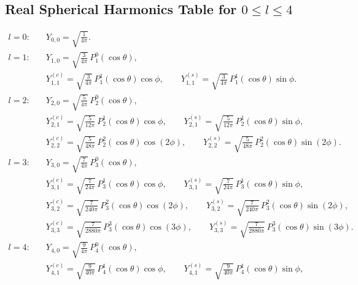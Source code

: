 \clearpage
\subsection*{Real Spherical Harmonics Table for $0\le l\le4$}
\begin{align*}
      l=0:\quad &Y_{0,0}=\sqrt{\frac{1}{4\pi}}.\\
      l=1:\quad &Y_{1,0}=\sqrt{\frac{3}{4\pi}}\,P_1^0(\cos\theta),\\
                                    &Y_{1,1}^{(c)}=\sqrt{\frac{3}{4\pi}}\,P_1^1(\cos\theta)\cos\phi,\qquad
                                     Y_{1,1}^{(s)}=\sqrt{\frac{3}{4\pi}}\,P_1^1(\cos\theta)\sin\phi.\\
      l=2:\quad &Y_{2,0}=\sqrt{\frac{5}{4\pi}}\,P_2^0(\cos\theta),\\
                                    &Y_{2,1}^{(c)}=\sqrt{\frac{5}{12\pi}}\,P_2^1(\cos\theta)\cos\phi,\qquad
                                     Y_{2,1}^{(s)}=\sqrt{\frac{5}{12\pi}}\,P_2^1(\cos\theta)\sin\phi,\\
                                    &Y_{2,2}^{(c)}=\sqrt{\frac{5}{48\pi}}\,P_2^2(\cos\theta)\cos(2\phi),\qquad
                                     Y_{2,2}^{(s)}=\sqrt{\frac{5}{48\pi}}\,P_2^2(\cos\theta)\sin(2\phi).\\
      l=3:\quad &Y_{3,0}=\sqrt{\frac{7}{4\pi}}\,P_3^0(\cos\theta),\\
                                    &Y_{3,1}^{(c)}=\sqrt{\frac{7}{24\pi}}\,P_3^1(\cos\theta)\cos\phi,\qquad
                                     Y_{3,1}^{(s)}=\sqrt{\frac{7}{24\pi}}\,P_3^1(\cos\theta)\sin\phi,\\
                                    &Y_{3,2}^{(c)}=\sqrt{\frac{7}{240\pi}}\,P_3^2(\cos\theta)\cos(2\phi),\qquad
                                     Y_{3,2}^{(s)}=\sqrt{\frac{7}{240\pi}}\,P_3^2(\cos\theta)\sin(2\phi),\\
                                    &Y_{3,3}^{(c)}=\sqrt{\frac{7}{2880\pi}}\,P_3^3(\cos\theta)\cos(3\phi),\qquad
                                     Y_{3,3}^{(s)}=\sqrt{\frac{7}{2880\pi}}\,P_3^3(\cos\theta)\sin(3\phi).\\
      l=4:\quad &Y_{4,0}=\sqrt{\frac{9}{4\pi}}\,P_4^0(\cos\theta),\\
                                    &Y_{4,1}^{(c)}=\sqrt{\frac{9}{40\pi}}\,P_4^1(\cos\theta)\cos\phi,\qquad
                                     Y_{4,1}^{(s)}=\sqrt{\frac{9}{40\pi}}\,P_4^1(\cos\theta)\sin\phi,\\

\end{align*}
